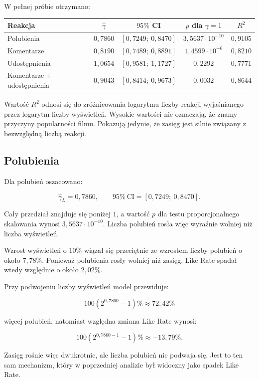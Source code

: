 \documentclass[12pt,a4paper]{article}
\begin{document}
W pełnej próbie otrzymano:

\begin{center}
\small
\begin{tabular}{lcccc}
\toprule
Reakcja & $\widehat{\gamma}$ & $95\%$ CI & $p$ dla $\gamma=1$ & $R^2$ \\
\midrule
Polubienia & $0{,}7860$ & $[0{,}7249;\ 0{,}8470]$ & $3{,}5637\cdot10^{-10}$ & $0{,}9105$ \\
Komentarze & $0{,}8190$ & $[0{,}7489;\ 0{,}8891]$ & $1{,}4599\cdot10^{-6}$ & $0{,}8210$ \\
Udostępnienia & $1{,}0654$ & $[0{,}9581;\ 1{,}1727]$ & $0{,}2292$ & $0{,}7771$ \\
Komentarze $+$ udostępnienia & $0{,}9043$ & $[0{,}8414;\ 0{,}9673]$ & $0{,}0032$ & $0{,}8644$ \\
\bottomrule
\end{tabular}
\end{center}

Wartość $R^2$ odnosi się do zróżnicowania logarytmu liczby reakcji wyjaśnianego przez logarytm liczby wyświetleń. Wysokie wartości nie oznaczają, że znamy przyczyny popularności filmu. Pokazują jedynie, że zasięg jest silnie związany z bezwzględną liczbą reakcji.

\subsection{Polubienia}

Dla polubień oszacowano:

\[
\widehat{\gamma}_{L}=0{,}7860,
\qquad
95\%\ \mathrm{CI}=[0{,}7249;\ 0{,}8470].
\]

Cały przedział znajduje się poniżej $1$, a wartość $p$ dla testu proporcjonalnego skalowania wynosi $3{,}5637\cdot10^{-10}$. Liczba polubień rosła więc wyraźnie wolniej niż liczba wyświetleń.

Wzrost wyświetleń o $10\%$ wiązał się przeciętnie ze wzrostem liczby polubień o około $7{,}78\%$. Ponieważ polubienia rosły wolniej niż zasięg, Like Rate spadał wtedy względnie o około $2{,}02\%$.

Przy podwojeniu liczby wyświetleń model przewiduje:

\[
100\left(2^{0{,}7860}-1\right)\%\approx72{,}42\%
\]

więcej polubień, natomiast względna zmiana Like Rate wynosi:

\[
100\left(2^{0{,}7860-1}-1\right)\%\approx-13{,}79\%.
\]

Zasięg rośnie więc dwukrotnie, ale liczba polubień nie podwaja się. Jest to ten sam mechanizm, który w poprzedniej analizie był widoczny jako spadek Like Rate.
\end{document}
